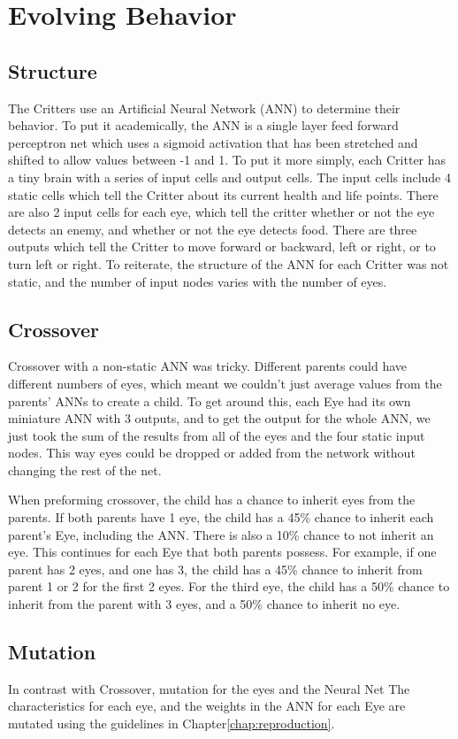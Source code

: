 
\chapter{Evolving Behavior}
\label{chap:ann}

\section{Structure}
The Critters use an Artificial Neural Network (ANN) to determine their behavior. To put it academically, the ANN is a single layer feed forward perceptron net which uses a sigmoid activation that has been stretched and shifted to allow values between -1 and 1. To put it more simply, each Critter has a tiny brain with a series of input cells and output cells. The input cells include 4 static cells which tell the Critter about its current health and life points. There are also 2 input cells for each eye, which tell the critter whether or not the eye detects an enemy, and whether or not the eye detects food. There are three outputs which tell the Critter to move forward or backward, left or right, or to turn left or right. To reiterate, the structure of the ANN for each Critter was not static, and the number of input nodes varies with the number of eyes.

\section{Crossover}
Crossover with a non-static ANN was tricky. Different parents could have different numbers of eyes, which meant we couldn't just average values from the parents' ANNs to create a child. To get around this, each Eye had its own miniature ANN with 3 outputs, and to get the output for the whole ANN, we just took the sum of the results from all of the eyes and the four static input nodes. This way eyes could be dropped or added from the network without changing the rest of the net.

When preforming crossover, the child has a chance to inherit eyes from the parents. If both parents have 1 eye, the child has a 45\% chance to inherit each parent's Eye, including the ANN. There is also a 10\% chance to not inherit an eye. This continues for each Eye that both parents possess. For example, if one parent has 2 eyes, and one has 3, the child has a 45\% chance to inherit from parent 1 or 2 for the first 2 eyes. For the third eye, the child has a 50\% chance to inherit from the parent with 3 eyes, and a 50\% chance to inherit no eye.

\section{Mutation}
In contrast with Crossover, mutation for the eyes and the Neural Net The characteristics for each eye, and the weights in the ANN for each Eye are mutated using the guidelines in Chapter\autoref{chap:reproduction}. 